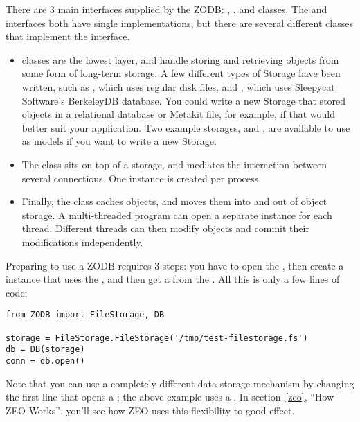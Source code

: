 There are 3 main interfaces supplied by the ZODB:
, , and  classes. The
 and  interfaces both have single
implementations, but there are several different classes that
implement the  interface.

\begin{itemize}
 \item {} classes are the lowest layer, and handle
 storing and retrieving objects from some form of long-term storage.
 A few different types of Storage have been written, such as
 , which uses regular disk files, and
 , which uses Sleepycat Software's BerkeleyDB
 database.  You could write a new Storage that stored objects in a
 relational database or Metakit file, for example, if that would
 better suit your application.  Two example storages,
  and , are available to use
 as models if you want to write a new Storage.

 \item The  class sits on top of a storage, and mediates the
 interaction between several connections.  One  instance is
 created per process.

 \item Finally, the  class caches objects, and moves
 them into and out of object storage.  A multi-threaded program can
 open a separate  instance for each thread.
 Different threads can then modify objects and commit their
 modifications independently.

\end{itemize}

Preparing to use a ZODB requires 3 steps: you have to open the
, then create a  instance that uses the , and then get
a  from the .  All this is only a few lines of
code:

\begin{verbatim}
from ZODB import FileStorage, DB

storage = FileStorage.FileStorage('/tmp/test-filestorage.fs')
db = DB(storage)
conn = db.open()
\end{verbatim}

Note that you can use a completely different data storage mechanism by
changing the first line that opens a ; the above example uses a
.  In section~\ref{zeo}, ``How ZEO Works'',
you'll see how ZEO uses this flexibility to good effect.

